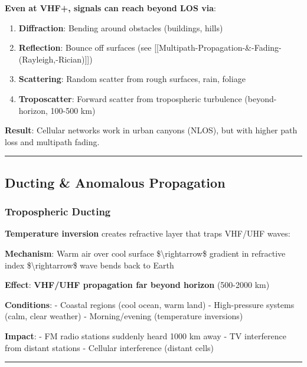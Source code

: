 \textbf{Even at VHF+, signals can reach beyond LOS via}:

\begin{enumerate}
\def\labelenumi{\arabic{enumi}.}
\tightlist
\item
  \textbf{Diffraction}: Bending around obstacles (buildings, hills)
\item
  \textbf{Reflection}: Bounce off surfaces (see
  {[}{[}Multipath-Propagation-\&-Fading-(Rayleigh,-Rician){]}{]})
\item
  \textbf{Scattering}: Random scatter from rough surfaces, rain, foliage
\item
  \textbf{Troposcatter}: Forward scatter from tropospheric turbulence
  (beyond-horizon, 100-500 km)
\end{enumerate}

\textbf{Result}: Cellular networks work in urban canyons (NLOS), but
with higher path loss and multipath fading.

\begin{center}\rule{0.5\linewidth}{0.5pt}\end{center}

\subsection{Ducting \& Anomalous
Propagation}\label{ducting-anomalous-propagation}

\subsubsection{Tropospheric Ducting}\label{tropospheric-ducting}

\textbf{Temperature inversion} creates refractive layer that traps
VHF/UHF waves:

\textbf{Mechanism}: Warm air over cool surface
\$\textbackslash rightarrow\$ gradient in refractive index
\$\textbackslash rightarrow\$ wave bends back to Earth

\textbf{Effect}: \textbf{VHF/UHF propagation far beyond horizon}
(500-2000 km)

\textbf{Conditions}: - Coastal regions (cool ocean, warm land) -
High-pressure systems (calm, clear weather) - Morning/evening
(temperature inversions)

\textbf{Impact}: - FM radio stations suddenly heard 1000 km away - TV
interference from distant stations - Cellular interference (distant
cells)

\begin{center}\rule{0.5\linewidth}{0.5pt}\end{center}

